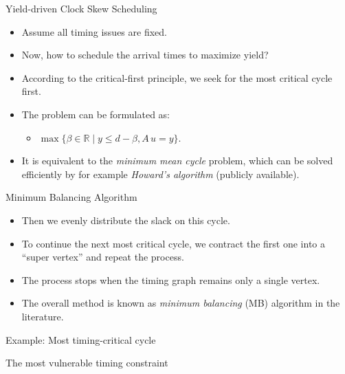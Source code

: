 \documentclass[10pt,ignorenonframetext,mathserif,onlymath]{beamer}
\providecommand{\tightlist}{%
  \setlength{\itemsep}{0pt}\setlength{\parskip}{0pt}}
\begin{document}
\begin{frame}{Yield-driven Clock Skew Scheduling}
\protect\hypertarget{yield-driven-clock-skew-scheduling}{}

\begin{itemize}
\tightlist
\item
  Assume all timing issues are fixed.
\item
  Now, how to schedule the arrival times to maximize yield?
\item
  According to the critical-first principle, we seek for the most
  critical cycle first.
\item
  The problem can be formulated as:

  \begin{itemize}
  \tightlist
  \item
    \(\max\{\beta \in \mathbb{R} \mid y \leq d - \beta, A\,u = y\}\).
  \end{itemize}
\item
  It is equivalent to the \emph{minimum mean cycle} problem, which can
  be solved efficiently by for example \emph{Howard’s algorithm}
  (publicly available).
\end{itemize}

\end{frame}

\begin{frame}{Minimum Balancing Algorithm}
\protect\hypertarget{minimum-balancing-algorithm}{}

\begin{itemize}
\tightlist
\item
  Then we evenly distribute the slack on this cycle.
\item
  To continue the next most critical cycle, we contract the first one
  into a “super vertex” and repeat the process.
\item
  The process stops when the timing graph remains only a single vertex.
\item
  The overall method is known as \emph{minimum balancing} (MB) algorithm
  in the literature.
\end{itemize}

\end{frame}

\begin{frame}{Example: Most timing-critical cycle}
\protect\hypertarget{example-most-timing-critical-cycle}{}

The most vulnerable timing constraint



\end{frame}
\end{document}
